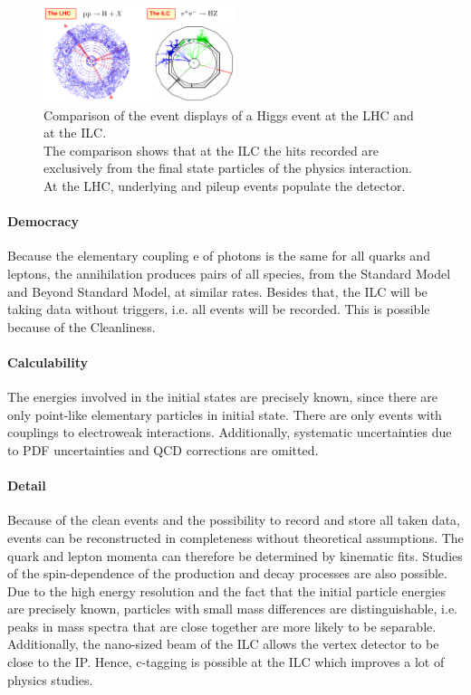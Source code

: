 \begin{figure}
\centering
\includegraphics[width=0.5\textwidth]{Figures/Cleanliness.png}
\caption[Clean environment at the ILC]{Comparison of the event displays of a Higgs event at the  LHC and at the ILC.\cite[p. 4]{ILCPhysics_Thomson}\\
The comparison shows that at the ILC the hits recorded are exclusively from the final state particles of the physics interaction.
At the LHC, underlying and pileup events populate the detector.}
\label{fig:Cleanliness}
\end{figure}

\paragraph{Democracy}
Because the elementary coupling e of photons is the same for all quarks and leptons, the \electron \positron annihilation produces pairs of all species, from the Standard Model and Beyond Standard Model, at similar rates.
Besides that, the ILC will be taking data without triggers, i.e. all events will be recorded.
This is possible because of the Cleanliness.
\paragraph{Calculability}
The energies involved in the initial states are precisely known, since there are only point-like elementary particles in initial state.
There are only events with couplings to electroweak interactions.
Additionally, systematic uncertainties due to PDF uncertainties and QCD corrections are omitted.
\paragraph{Detail}
Because of the clean events and the possibility to record and store all taken data, events can be reconstructed in completeness without theoretical assumptions.
The quark and lepton momenta can therefore be determined by kinematic fits.
Studies of the spin-dependence of the production and decay processes are also possible.\\
Due to the high energy resolution and the fact that the initial particle energies are precisely known, particles with small mass differences are distinguishable, i.e. peaks in mass spectra that are close together are more likely to be separable.\\
Additionally, the nano-sized beam of the ILC allows the vertex detector to be close to the IP. 
Hence, c-tagging is possible at the ILC which improves a lot of physics studies.

